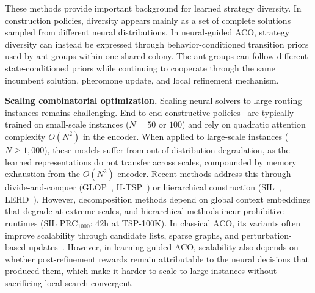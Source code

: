 These methods provide important background for learned strategy diversity. In construction policies, diversity appears mainly as a set of complete solutions sampled from different neural distributions. In neural-guided ACO, strategy diversity can instead be expressed through behavior-conditioned transition priors used by ant groups within one shared colony. The ant groups can follow different state-conditioned priors while continuing to cooperate through the same incumbent solution, pheromone update, and local refinement mechanism.

\smallskip\noindent\textbf{Scaling combinatorial optimization.}
Scaling neural solvers to large routing instances remains challenging. 
End-to-end constructive policies~\cite{attentionmodel,pomo,bq,lehd, invit, sigd} are typically trained on small-scale instances ($N{=}50$ or $100$) and rely on quadratic attention complexity $O(N^2)$ in the encoder.
When applied to large-scale instances ($N{\geq}1{,}000$), these models suffer from out-of-distribution degradation, as the learned representations do not transfer across scales, compounded by memory exhaustion from the $O(N^2)$ encoder. Recent methods address this through divide-and-conquer (GLOP~\cite{glop}, H-TSP~\cite{htsp}) or hierarchical construction (SIL~\cite{sil}, LEHD~\cite{lehd}).
However, decomposition methods depend on global context embeddings that degrade at extreme scales, and hierarchical methods incur prohibitive runtimes (SIL PRC$_{1000}$: 42h at TSP-100K).
In classical ACO, its variants often improve scalability through candidate lists, sparse graphs, and perturbation-based updates~\cite{partialACO,faco,PACO}. However, in learning-guided ACO, scalability also depends on whether post-refinement rewards remain attributable to the neural decisions that produced them, which make it harder to scale to large instances without sacrificing local search convergent.
